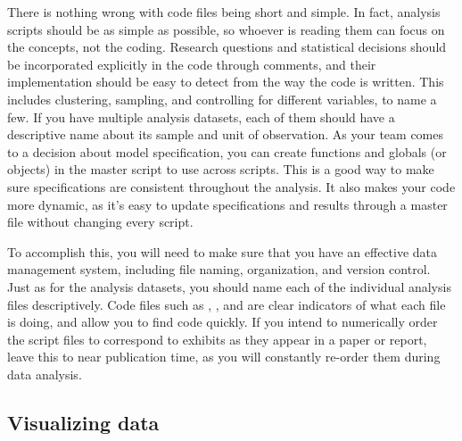 There is nothing wrong with code files being short and simple.
In fact, analysis scripts should be as simple as possible,
so whoever is reading them can focus on the concepts, not the coding.
Research questions and statistical decisions should be incorporated explicitly in the code through comments,
and their implementation should be easy to detect from the way the code is written.
This includes clustering, sampling, and controlling for different variables, to name a few.
If you have multiple analysis datasets,
each of them should have a descriptive name about its sample and unit of observation.
As your team comes to a decision about model specification,
you can create functions and globals (or objects) in the master script to use across scripts.
This is a good way to make sure specifications are consistent throughout the analysis.
It also makes your code more dynamic,
as it's easy to update specifications and results
through a master file without changing every script.


To accomplish this, you will need to make sure that you have an effective data management system,
including file naming, organization, and version control.
Just as for the analysis datasets,
you should name each of the individual analysis files descriptively.
Code files such as ,
, and 
are clear indicators of what each file is doing, and allow you to find code quickly.
If you intend to numerically order the script files
to correspond to exhibits as they appear in a paper or report,
leave this to near publication time,
as you will constantly re-order them during data analysis.

\subsection{Visualizing data}

